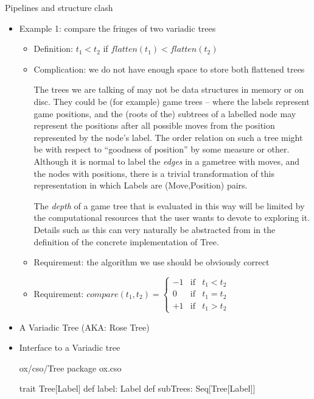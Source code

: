 \documentclass{concdistfoils}
\def\<{\begin{array}{lll}}
\def\>{\end{array}}
\def\heading#1{\begin{cframed}[8.8in]{#1}\end{cframed}}
\begin{document}
\begin{slide}
\heading{Pipelines and structure clash}
\vfill
\begin{itemize}

\item Example 1: compare the fringes of two variadic trees 
\begin{itemize}
\item Definition: $t_1<t_2$ if $flatten(t_1)<flatten(t_2)$
\item Complication: we do not have enough space to store both flattened trees
\begin{note}
The trees we are talking of may not be data structures in memory or
on disc. They could be (for example) game trees -- where the labels 
represent game positions, and the (roots of the) subtrees of a labelled node
may represent the positions after all possible moves from the position
represented by the node's label. The order relation on such a tree might be with respect
to ``goodness of position'' by some measure or other. Although it is normal
to label the \textit{edges} in a gametree with moves, and the nodes
with positions, there is a trivial transformation of this representation
in which Labels are (Move,Position) pairs.

The \textit{depth} of a game tree that is  evaluated in this way
will be limited by the computational resources that the
user wants to devote to exploring it. Details such as this can very
naturally be abstracted from in the definition of the concrete 
implementation of Tree.
\end{note}
\item Requirement: the algorithm we use should be obviously correct
\item Requirement: $compare(t_1, t_2) = 
      \left\{\<-1&\textrm{if}&t_1<t_2\\0&\textrm{if}&t_1=t_2\\+1&\textrm{if}&t_1>t_2\>
      \right.$
\end{itemize}
\end{itemize}
\vfill
\end{slide}


\begin{slide}
\begin{itemize}
\item A Variadic Tree (AKA: Rose Tree)
\begin{center}
\end{center}
\vfill
\item Interface to a Variadic tree 
\begin{obj}{ox/cso/Tree}
package ox.cso

trait Tree[Label]
{ def label:    Label
  def subTrees: Seq[Tree[Label]]
}
\end{obj}
\end{itemize}
\end{slide}
\end{document}
